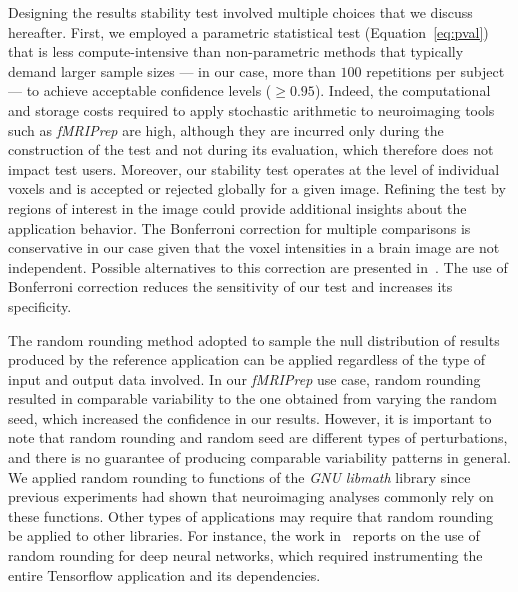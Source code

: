 \documentclass[lettersize,journal]{IEEEtran}
\newcommand{\fmriprep}{\emph{fMRIPrep}\xspace}
\begin{document}
{%
Designing the results stability test involved multiple choices that we discuss hereafter.
First, we employed a parametric statistical test (Equation~\ref{eq:pval}) that is less compute-intensive than non-parametric methods that typically demand larger sample sizes --- in our case, more than $100$ repetitions per subject --- to achieve acceptable confidence levels ($\geq 0.95$).
Indeed, the computational and storage costs required to apply stochastic arithmetic to neuroimaging tools such as \fmriprep are high, although they are incurred only during the construction of the test and not during its evaluation, which therefore does not impact test users. Moreover, our stability test operates at the level of individual voxels and is accepted or rejected globally for a given image. Refining the test by regions of interest in the image could provide additional insights about the application behavior.
The Bonferroni correction for multiple comparisons is conservative in our case given that the voxel intensities in a brain image are not independent.
Possible alternatives to this correction are presented in~\cite{NICHOLS2007246}. The use of Bonferroni correction reduces the sensitivity of our test and increases its specificity.


The random rounding method adopted to sample the null distribution of results produced by the reference application can be applied regardless of the type of input and output data involved. In our \fmriprep use case, random rounding resulted in comparable variability to the one obtained from varying the random seed, which increased the confidence in our results. However, it is important to note that random rounding and random seed are different types of perturbations, and there is no guarantee of producing comparable variability patterns in general. We applied random rounding to functions of the \emph{GNU libmath} library since previous experiments had shown that neuroimaging analyses commonly rely on these functions. Other types of applications may require that random rounding be applied to other libraries. For instance, the work in~\cite{pepe2022numerical} reports on the use of random rounding for deep neural networks, which required instrumenting the entire Tensorflow application and its dependencies.

}
\end{document}
